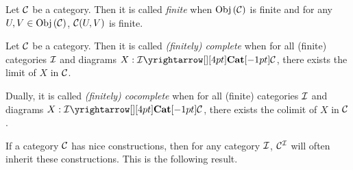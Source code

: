\begin{dfn}
  
  Let $\mathcal{C}$ be a category. 
  Then it is called \emph{finite} when 
  $\mathrm{Obj}\left(\mathcal{C}\right)$ is finite and for any $U, V \in \mathrm{Obj}\left(\mathcal{C}\right)$,
  $\mathcal{C}(U,V)$ is finite. 
\end{dfn}

\begin{dfn}
  
  Let $\mathcal{C}$ be a category. 
  Then it is called \emph{(finitely) complete} when 
  for all (finite) categories $\mathcal{I}$ and diagrams $X : \map{\II}{\CC}{\CAT}{}$,
  there exists the limit of $X$ in $\mathcal{C}$.

  Dually, it is called \emph{(finitely) cocomplete} when 
  for all (finite) categories $\mathcal{I}$ and 
  diagrams $X : \map{\II}{\CC}{\CAT}{}$,
  there exists the colimit of $X$ in $\mathcal{C}$.
\end{dfn}

\begin{rmk}
  If a category $\mathcal{C}$ has nice constructions,
  then for any category $\mathcal{I}$, $\mathcal{C}^{\mathcal{I}}$ will often inherit these constructions.
  This is the following result. 
\end{rmk}

